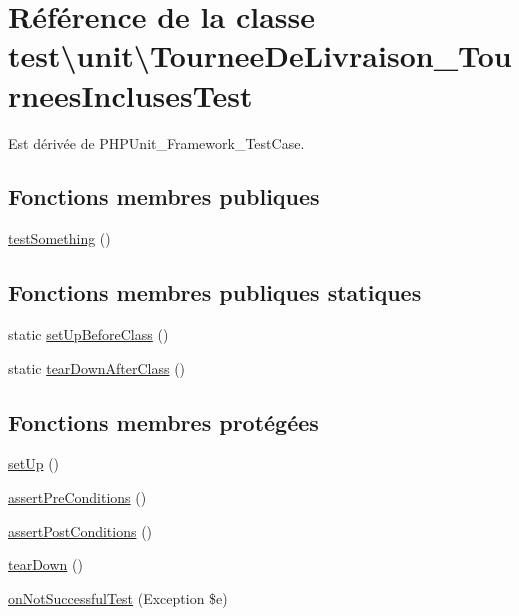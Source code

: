 \hypertarget{classtest_1_1unit_1_1TourneeDeLivraison__TourneesInclusesTest}{}\section{Référence de la classe test\textbackslash{}unit\textbackslash{}Tournee\+De\+Livraison\+\_\+\+Tournees\+Incluses\+Test}
\label{classtest_1_1unit_1_1TourneeDeLivraison__TourneesInclusesTest}


Est dérivée de P\+H\+P\+Unit\+\_\+\+Framework\+\_\+\+Test\+Case.

\subsection*{Fonctions membres publiques}
\begin{DoxyCompactItemize}
\item 
\hyperlink{classtest_1_1unit_1_1TourneeDeLivraison__TourneesInclusesTest_a24e6ac3b096fbd30dfcc4d095f21980e}{test\+Something} ()
\end{DoxyCompactItemize}
\subsection*{Fonctions membres publiques statiques}
\begin{DoxyCompactItemize}
\item 
static \hyperlink{classtest_1_1unit_1_1TourneeDeLivraison__TourneesInclusesTest_a5fe24e17669fe008186f0a7a25742346}{set\+Up\+Before\+Class} ()
\item 
static \hyperlink{classtest_1_1unit_1_1TourneeDeLivraison__TourneesInclusesTest_a7aa4f8e4fcc5c14c935d0d97059172a7}{tear\+Down\+After\+Class} ()
\end{DoxyCompactItemize}
\subsection*{Fonctions membres protégées}
\begin{DoxyCompactItemize}
\item 
\hyperlink{classtest_1_1unit_1_1TourneeDeLivraison__TourneesInclusesTest_acc7c5dd58fdfff172a1ef2969eca4afa}{set\+Up} ()
\item 
\hyperlink{classtest_1_1unit_1_1TourneeDeLivraison__TourneesInclusesTest_a2e46e8e7b6d8326d11262d1d9d6e967f}{assert\+Pre\+Conditions} ()
\item 
\hyperlink{classtest_1_1unit_1_1TourneeDeLivraison__TourneesInclusesTest_afffde2c45909f7ace32efbee038096d6}{assert\+Post\+Conditions} ()
\item 
\hyperlink{classtest_1_1unit_1_1TourneeDeLivraison__TourneesInclusesTest_adfa081d7520a6a59565e32a2db9677d0}{tear\+Down} ()
\item 
\hyperlink{classtest_1_1unit_1_1TourneeDeLivraison__TourneesInclusesTest_a00e0e0b1a7f3bd33d2242d8bcd7cf155}{on\+Not\+Successful\+Test} (Exception \$e)
\end{DoxyCompactItemize}


